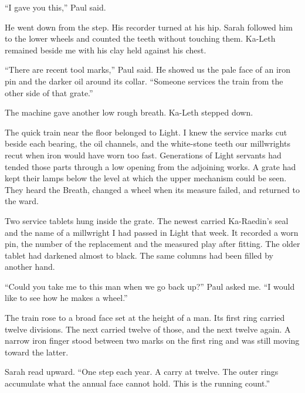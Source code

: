 ``I gave you this,'' Paul said.\par

He went down from the step. His recorder turned at his hip. Sarah followed him to the lower wheels and counted the teeth without touching them. Ka-Leth remained beside me with his clay held against his chest.\par

``There are recent tool marks,'' Paul said. He showed us the pale face of an iron pin and the darker oil around its collar. ``Someone services the train from the other side of that grate.''\par

The machine gave another low rough breath. Ka-Leth stepped down.\par

\ornament

The quick train near the floor belonged to Light. I knew the service marks cut beside each bearing, the oil channels, and the white-stone teeth our millwrights recut when iron would have worn too fast. Generations of Light servants had tended those parts through a low opening from the adjoining works. A grate had kept their lamps below the level at which the upper mechanism could be seen. They heard the Breath, changed a wheel when its measure failed, and returned to the ward.\par

Two service tablets hung inside the grate. The newest carried Ka-Raedin's seal and the name of a millwright I had passed in Light that week. It recorded a worn pin, the number of the replacement and the measured play after fitting. The older tablet had darkened almost to black. The same columns had been filled by another hand.\par

``Could you take me to this man when we go back up?'' Paul asked me. ``I would like to see how he makes a wheel.''\par

The train rose to a broad face set at the height of a man. Its first ring carried twelve divisions. The next carried twelve of those, and the next twelve again. A narrow iron finger stood between two marks on the first ring and was still moving toward the latter.\par

Sarah read upward. ``One step each year. A carry at twelve. The outer rings accumulate what the annual face cannot hold. This is the running count.''\par

